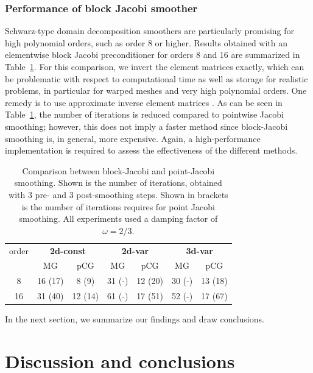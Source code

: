 \documentclass[smallcondensed,final]{svjour3}     %
\begin{document}
\subsubsection{Performance of block Jacobi smoother}\label{subsec:num_block}
Schwarz-type domain decomposition smoothers are particularly promising
for high polynomial orders, such as order 8 or higher. Results
obtained with an elementwise block Jacobi preconditioner for orders 8
and 16 are summarized in Table~\ref{tab:block-jac}. For this
comparison, we invert the element matrices exactly, which can be
problematic with respect to computational time as well as storage for
realistic problems, in particular for warped meshes and very high
polynomial orders. One remedy is to use approximate inverse element
matrices \cite{LottesFischer05}. As can be seen in
Table~\ref{tab:block-jac}, the
number of iterations is reduced compared to pointwise Jacobi
smoothing; however, this does not imply a faster method since
block-Jacobi smoothing is, in general, more expensive. Again, a
high-performance implementation is required to assess the
effectiveness of the different methods.
\begin{table}\centering
	\caption{\label{tab:block-jac} Comparison between block-Jacobi
          and point-Jacobi smoothing. Shown is the number of
          iterations, obtained with 3
          pre- and 3 post-smoothing steps. Shown in brackets is the
          number of iterations requires for point Jacobi
          smoothing. All experiments used a damping factor of $\omega=2/3$.}
\begin{tabular}{|c|c|c|c|c|c|c|}
	\hline
	order & \multicolumn{2}{c|}{\bf 2d-const} &
        \multicolumn{2}{c|}{\bf 2d-var} & \multicolumn{2}{c|}{\bf 3d-var} \\
	\cline{2-7}
	 & MG & pCG  & MG & pCG & MG & pCG \\
	\hline
	8  & 16 (17) & 8 (9)   &  31 (-)  & 12 (20) & 30 (-)  &  13 (18) \\    %
	16 & 31 (40) & 12 (14) &  61 (-)  & 17 (51) & 52 (-)  &  17 (67)  \\   %
	\hline
\end{tabular}
\end{table}
In the next section, we summarize our findings and draw conclusions.

\section{Discussion and conclusions}
\label{sec:discuss}
\end{document}
